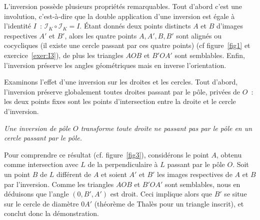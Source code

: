 L'inversion possède plusieurs propriétés remarquables. Tout d'abord c'est une involution, c'est-à-dire que la double application d'une inversion est égale à l'identité $I$~: $\mathcal{I}_K \circ \mathcal{I}_K=I$. \'{E}tant donnés deux points distincts $A$ et $B$ d'images respectives $A'$ et $B'$, alors les quatre points $A,A',B,B'$ sont alignés ou cocycliques (il existe une cercle passant par ces quatre points) (cf figure~\ref{fig1} et exercice~\ref{exer:I3}), de plus les triangles $AOB$ et $B'OA'$ sont semblables. Enfin, l'inversion préserve les angles géométriques mais en inverse l'orientation. 


Examinons l'effet d'une inversion sur les droites et les cercles. Tout d'abord, l'inversion préserve globalement toutes droites passant par le pôle, privées de $O$~: les deux points fixes sont les points d'intersection entre la droite et le cercle d'inversion. 

\emph{Une inversion de pôle $O$ transforme toute droite ne passant pas par le pôle en un cercle passant par le pôle.}

Pour comprendre ce résultat (cf. figure~\ref{fig3}), considérons le point $A$, obtenu comme intersection avec $L$ de la perpendiculaire à $L$ passant par le pôle $O$. Soit un point $B$ de $L$ différent de $A$ et soient $A'$ et $B'$ les images respectives de $A$ et $B$ par l'inversion. Comme les triangles $AOB$ et $B'OA'$ sont semblables, nous en déduisons que l'angle $(0,B',A')$ est droit. Ceci implique alors que $B'$ se situe sur le cercle de diamètre $0A'$ (théorème de Thalès pour un triangle inscrit), et conclut donc la démonstration.  


